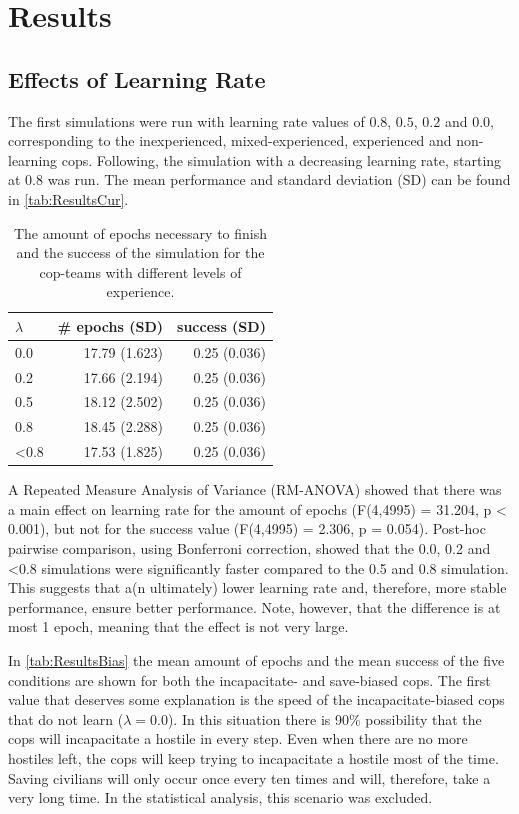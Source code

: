 \section{Results}
\subsection{Effects of Learning Rate}
The first simulations were run with learning rate values of $0.8$, $0.5$, $0.2$ and $0.0$, corresponding to the inexperienced, mixed-experienced, experienced and non-learning cops. Following, the simulation with a decreasing learning rate, starting at $0.8$ was run. The mean performance and standard deviation (SD) can be found in \autoref{tab:ResultsCur}. 

\begin{table}[!ht]
\begin{center}
\begin{tabular}{l r  r}
$\lambda$ &  \# epochs (SD) & success (SD)\\
\hline
0.0 & 17.79 (1.623) & 0.25 (0.036) \\
0.2 & 17.66 (2.194) & 0.25 (0.036) \\
0.5 & 18.12 (2.502) & 0.25 (0.036) \\
0.8 & 18.45 (2.288) & 0.25 (0.036) \\
<0.8 & 17.53 (1.825) & 0.25 (0.036) \\
\hline
\end{tabular}
\caption{The amount of epochs necessary to finish and the success of the simulation for the cop-teams with different levels of experience. }
\label{tab:ResultsCur}
\end{center}
\end{table}
A Repeated Measure Analysis of Variance (RM-ANOVA) showed that there was a main effect on learning rate for the amount of epochs (F(4,4995) = 31.204, p < 0.001), but not for the success value (F(4,4995) = 2.306, p = 0.054). Post-hoc pairwise comparison, using Bonferroni correction, showed that the 0.0, 0.2 and <0.8 simulations were significantly faster compared to the 0.5 and 0.8 simulation. This suggests that a(n ultimately) lower learning rate and, therefore, more stable performance, ensure better performance. Note, however, that the difference is at most 1 epoch, meaning that the effect is not very large. 

In \autoref{tab:ResultsBias} the mean amount of epochs and the mean success of the five conditions are shown for both the incapacitate- and save-biased cops. The first value that deserves some explanation is the speed of the incapacitate-biased cops that do not learn ($\lambda = 0.0$). In this situation there is 90\% possibility that the cops will incapacitate a hostile in every step. Even when there are no more hostiles left, the cops will keep trying to incapacitate a hostile most of the time. Saving civilians will only occur once every ten times and will, therefore, take a very long time. In the statistical analysis, this scenario was excluded. 


